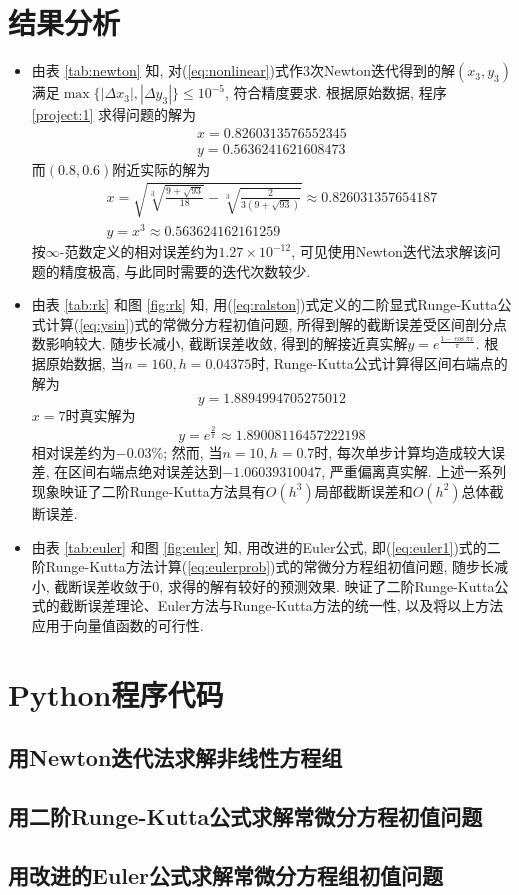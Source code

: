 \documentclass{nedsart}
\begin{document}
\section{结果分析}

\begin{itemize}
    \item 由表 \ref{tab:newton} 知, 对(\ref{eq:nonlinear})式作3次Newton迭代得到的解$(x_3,y_3)$满足$\max\{|\Delta{x_3}|, |\Delta{y_3}|\} \leq 10^{-5}$, 符合精度要求. 根据原始数据, 程序 \ref{project:1} 求得问题的解为$$
    \begin{gathered}
        x = 0.8260313576552345 \\
        y = 0.5636241621608473
    \end{gathered}$$而$(0.8,0.6)$附近实际的解为
    $$\begin{gathered}
        x = \sqrt{\sqrt[3]{\frac{9+\sqrt{93}}{18}}-\sqrt[3]{\frac{2}{3(9+\sqrt{93})}}} \approx 0.826031357654187 \\
        y = x^3 \approx 0.563624162161259
    \end{gathered}$$按$\infty$-范数定义的相对误差约为$1.27\times10^{-12}$, 可见使用Newton迭代法求解该问题的精度极高, 与此同时需要的迭代次数较少.
    \item 由表 \ref{tab:rk} 和图 \ref{fig:rk} 知, 用(\ref{eq:ralston})式定义的二阶显式Runge-Kutta公式计算(\ref{eq:ysin})式的常微分方程初值问题, 所得到解的截断误差受区间剖分点数影响较大. 随步长减小, 截断误差收敛, 得到的解接近真实解$y=e^{\frac{1-\cos{\pi x}}{\pi}}$. 根据原始数据, 当$n=160,h=0.04375$时, Runge-Kutta公式计算得区间右端点的解为$$y=1.8894994705275012$$$x=7$时真实解为$$y = e^{\frac{2}{\pi}} \approx 1.89008116457222198$$相对误差约为$-0.03\%$; 然而, 当$n=10,h=0.7$时, 每次单步计算均造成较大误差, 在区间右端点绝对误差达到$-1.06039310047$, 严重偏离真实解. 上述一系列现象映证了二阶Runge-Kutta方法具有$O(h^3)$局部截断误差和$O(h^2)$总体截断误差.
    \item 由表 \ref{tab:euler} 和图 \ref{fig:euler} 知, 用改进的Euler公式, 即(\ref{eq:euler1})式的二阶Runge-Kutta方法计算(\ref{eq:eulerprob})式的常微分方程组初值问题, 随步长减小, 截断误差收敛于0, 求得的解有较好的预测效果. 映证了二阶Runge-Kutta公式的截断误差理论、Euler方法与Runge-Kutta方法的统一性, 以及将以上方法应用于向量值函数的可行性.
\end{itemize}




\setupappendix

\clearpage
\section{Python程序代码}

\subsection{用Newton迭代法求解非线性方程组}

\subsection{用二阶Runge-Kutta公式求解常微分方程初值问题}

\subsection{用改进的Euler公式求解常微分方程组初值问题}
\end{document}
